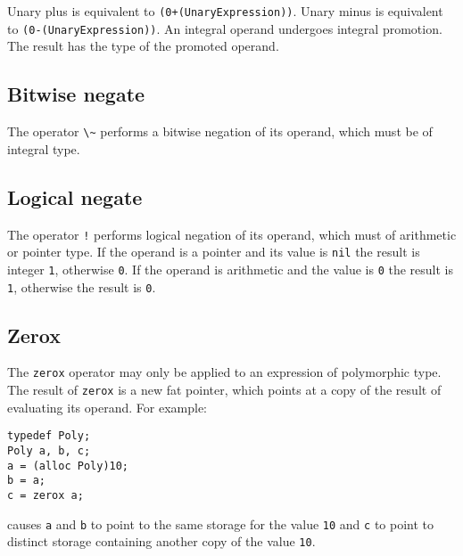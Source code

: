 Unary plus is equivalent to
\passthrough{\lstinline!(0+(UnaryExpression))!}. Unary minus is
equivalent to \passthrough{\lstinline!(0-(UnaryExpression))!}. An
integral operand undergoes integral promotion. The result has the type
of the promoted operand.

\hypertarget{bitwise-negate}{%
\subsection{Bitwise negate}\label{bitwise-negate}}

The operator \passthrough{\lstinline!\~!} performs a bitwise negation of
its operand, which must be of integral type.

\hypertarget{logical-negate}{%
\subsection{Logical negate}\label{logical-negate}}

The operator \passthrough{\lstinline"!"} performs logical negation of
its operand, which must of arithmetic or pointer type. If the operand is
a pointer and its value is \passthrough{\lstinline!nil!} the result is
integer \passthrough{\lstinline!1!}, otherwise
\passthrough{\lstinline!0!}. If the operand is arithmetic and the value
is \passthrough{\lstinline!0!} the result is
\passthrough{\lstinline!1!}, otherwise the result is
\passthrough{\lstinline!0!}.

\hypertarget{zerox}{%
\subsection{Zerox}\label{zerox}}

The \passthrough{\lstinline!zerox!} operator may only be applied to an
expression of polymorphic type. The result of
\passthrough{\lstinline!zerox!} is a new fat pointer, which points at a
copy of the result of evaluating its operand. For example:

\begin{lstlisting}
typedef Poly;
Poly a, b, c;
a = (alloc Poly)10;
b = a; 
c = zerox a;
\end{lstlisting}

causes \passthrough{\lstinline!a!} and \passthrough{\lstinline!b!} to
point to the same storage for the value \passthrough{\lstinline!10!} and
\passthrough{\lstinline!c!} to point to distinct storage containing
another copy of the value \passthrough{\lstinline!10!}.

